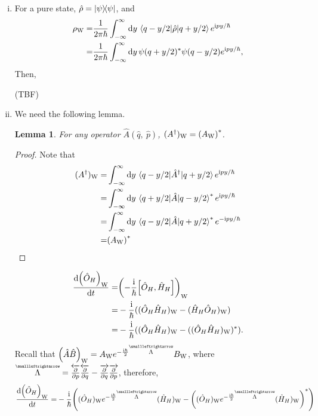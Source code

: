 \documentclass{article}
\newtheorem{lemma}[theorem]{Lemma}
\newcommand{\iu}{\ensuremath{\mathrm{i}}}
\newcommand{\tensor}[1]{\overset{\scriptscriptstyle\smallleftrightarrow}{#1}}
\begin{document}
\begin{enumerate}[1.]
\begin{enumerate}[(i)]
    \item For a pure state, $\hat{\rho} = \op{\psi}$, and
    \begin{align*}
      \rho_\mathrm{W} =& \frac{1}{2\pi\hbar}\int_{-\infty}^{\infty} \dd{y} \mel{q-y/2}{\hat{\rho}}{q + y/2}e^{\iu p y / \hbar} \\
      =&\frac{1}{2\pi\hbar}\int_{-\infty}^{\infty} \dd{y} \psi(q+y/2)^*\psi(q-y/2)e^{\iu p y / \hbar},
    \end{align*}
    Then,

    (TBF)
    
    \item We need the following lemma.
    \begin{lemma}
      For any operator $\hat{A}(\hat{q},\ \hat{p})$, $(A^\dagger)_\mathrm{W} = \qty({A_\mathrm{W}})^*$.
    \end{lemma}
    \begin{proof}
      Note that
      \begin{align*}
        (A^\dagger)_\mathrm{W} =& \int_{-\infty}^{\infty}\dd{y}\mel{q-y/2}{\hat{A}^{\dagger}}{q + y/2} e^{\iu p y / \hbar}
        \\
        =& \int_{-\infty}^{\infty}\dd{y}\mel{q+y/2}{\hat{A}}{q - y/2}^* e^{\iu p y / \hbar}\\
        =& \int_{-\infty}^{\infty}\dd{y}\mel{q-y/2}{\hat{A}}{q + y/2}^* e^{-\iu p y / \hbar}\\
        =& \qty({A_\mathrm{W}})^*
      \end{align*}
    \end{proof}
    \begin{align*}
      \dv{\qty(\hat{O}_H)_\mathrm{W}}{t} =& \qty(-\frac{\iu}{\hbar}\comm{\hat{O}_H}{\hat{H}_H})_\mathrm{W}\\
      =& -\frac{\iu}{\hbar}((\hat{O}_H\hat{H}_H)_\mathrm{W}-(\hat{H}_H\hat{O}_H)_\mathrm{W})\\
      =& -\frac{\iu}{\hbar}((\hat{O}_H\hat{H}_H)_\mathrm{W}-((\hat{O}_H\hat{H}_H)_\mathrm{W})^*).
    \end{align*}
    Recall that $\qty(\hat{A}\hat{B})_\mathrm{W} = A_\mathrm{W} e^{-\frac{\iu\hbar}{2}\tensor{\Lambda}}B_\mathrm{W}$, where $\tensor{\Lambda} = \overleftarrow{\pdv{p}}\overleftarrow{\pdv{q}} - \overrightarrow{\pdv{q}}\overrightarrow{\pdv{p}}$, therefore,
    \begin{align*}
      \dv{\qty(\hat{O}_H)_\mathrm{W}}{t} 
      =& -\frac{\iu}{\hbar}\qty((\hat{O}_H)_\mathrm{W} e^{-\frac{\iu\hbar}{2}\tensor{\Lambda}} (\hat{H}_H)_\mathrm{W} - \qty((\hat{O}_H)_\mathrm{W} e^{-\frac{\iu\hbar}{2}\tensor{\Lambda}} (\hat{H}_H)_\mathrm{W})^*) \\

\end{align*}
\end{enumerate}
\end{enumerate}
\end{document}
